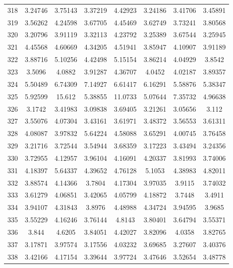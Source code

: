 \begin{center}
\begin{longtable}{cccccccc}
318 & 3.24746 & 3.75143 & 3.37219 & 4.42923 & 3.24186 & 3.41706 & 3.45891\\
319 & 3.56262 & 4.24598 & 3.67705 & 4.45469 & 3.62749 & 3.73241 & 3.80568\\
320 & 3.20796 & 3.91119 & 3.32113 & 4.23792 & 3.25389 & 3.67544 & 3.25945\\
321 & 4.45568 & 4.60669 & 4.34205 & 4.51941 & 3.85947 & 4.10907 & 3.91189\\
322 & 3.88716 & 5.10256 & 4.42498 & 5.15154 & 3.86214 & 4.04929 & 3.8542\\
323 & 3.5096 & 4.0882 & 3.91287 & 4.36707 & 4.0452 & 4.02187 & 3.89357\\
324 & 5.50489 & 6.74309 & 7.14927 & 6.61417 & 6.16291 & 5.58876 & 5.38347\\
325 & 5.92599 & 15.612 & 5.38855 & 11.0733 & 5.07644 & 7.35732 & 4.96638\\
326 & 3.1742 & 3.41983 & 3.09838 & 3.69405 & 3.21261 & 3.05656 & 3.112\\
327 & 3.55076 & 4.07304 & 3.43161 & 3.61971 & 3.48372 & 3.56553 & 3.61311\\
328 & 4.08087 & 3.97832 & 5.64224 & 4.58088 & 3.65291 & 4.00745 & 3.76458\\
329 & 3.21716 & 3.72544 & 3.54944 & 3.68359 & 3.17223 & 3.43494 & 3.24356\\
330 & 3.72955 & 4.12957 & 3.96104 & 4.16091 & 4.20337 & 3.81993 & 3.74006\\
331 & 4.18397 & 5.64337 & 4.39652 & 4.76128 & 5.1053 & 4.38983 & 4.82011\\
332 & 3.88574 & 4.14366 & 3.7804 & 4.17304 & 3.97035 & 3.9115 & 3.74032\\
333 & 3.61279 & 4.06851 & 3.42065 & 4.05799 & 4.18872 & 3.7448 & 3.4911\\
334 & 3.94107 & 4.31843 & 3.8976 & 4.48988 & 4.34724 & 3.94595 & 3.9685\\
335 & 3.55229 & 4.16246 & 3.76144 & 4.8143 & 3.80401 & 3.64794 & 3.55371\\
336 & 3.844 & 4.6205 & 3.84051 & 4.42027 & 3.82096 & 4.0358 & 3.82765\\
337 & 3.17871 & 3.97574 & 3.17556 & 4.03232 & 3.69685 & 3.27607 & 3.40376\\
338 & 3.42166 & 4.17154 & 3.39644 & 3.97724 & 3.47646 & 3.52654 & 3.48778\\
\end{longtable}
\end{center} 



